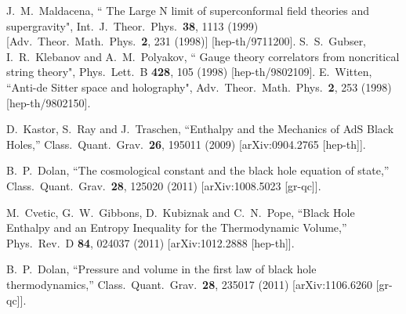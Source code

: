\documentclass[preprint,showpacs,showkeys,onecolumn,nofootinbib]{revtex4}
\begin{document}
\begin{thebibliography}{99}
  J.~M.~Maldacena,
  `` The Large N limit of superconformal field theories and supergravity",
  Int.\ J.\ Theor.\ Phys.\  {\bf 38}, 1113 (1999)
  [Adv.\ Theor.\ Math.\ Phys.\  {\bf 2}, 231 (1998)]
  [hep-th/9711200].
  S.~S.~Gubser, I.~R.~Klebanov and A.~M.~Polyakov,
  `` Gauge theory correlators from noncritical string theory",
  Phys.\ Lett.\ B {\bf 428}, 105 (1998)
  [hep-th/9802109].
  E.~Witten,
  ``Anti-de Sitter space and holography",
  Adv.\ Theor.\ Math.\ Phys.\  {\bf 2}, 253 (1998)
  [hep-th/9802150].

  D.~Kastor, S.~Ray and J.~Traschen,
  ``Enthalpy and the Mechanics of AdS Black Holes,''
  Class.\ Quant.\ Grav.\  {\bf 26}, 195011 (2009)
  [arXiv:0904.2765 [hep-th]].

  B.~P.~Dolan,
  ``The cosmological constant and the black hole equation of state,''
  Class.\ Quant.\ Grav.\  {\bf 28}, 125020 (2011)
  [arXiv:1008.5023 [gr-qc]].

  M.~Cvetic, G.~W.~Gibbons, D.~Kubiznak and C.~N.~Pope,
  ``Black Hole Enthalpy and an Entropy Inequality for the Thermodynamic Volume,''
  Phys.\ Rev.\ D {\bf 84}, 024037 (2011)
  [arXiv:1012.2888 [hep-th]].


  B.~P.~Dolan,
  ``Pressure and volume in the first law of black hole thermodynamics,''
  Class.\ Quant.\ Grav.\  {\bf 28}, 235017 (2011)
  [arXiv:1106.6260 [gr-qc]].


\end{thebibliography}
\end{document}
